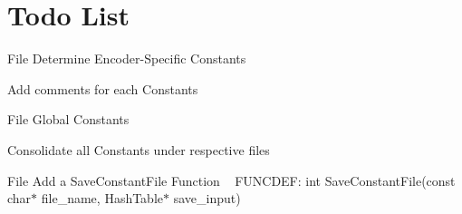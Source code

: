 \chapter{Todo List}
\hypertarget{todo}{}\label{todo}

\begin{DoxyRefList}
\item[File \doxylink{encoder__constants_8h}{encoder\+\_\+constants.h} ]\label{todo__todo000001}%
%
Determine Encoder-\/\+Specific Constants 



Add comments for each Constants 
\item[File \doxylink{global__constants_8h}{global\+\_\+constants.h} ]\label{todo__todo000002}%
%
Global Constants 



Consolidate all Constants under respective files  
\item[File \doxylink{load__constants_8h}{load\+\_\+constants.h} ]\label{todo__todo000003}%
%
Add a Save\+Constant\+File Function ~\newline
FUNCDEF\+: int Save\+Constant\+File(const char\texorpdfstring{$\ast$}{*} file\+\_\+name, Hash\+Table\texorpdfstring{$\ast$}{*} save\+\_\+input) 
\end{DoxyRefList}